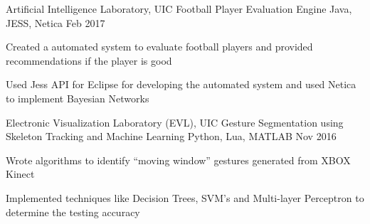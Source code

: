 \begin{cventries}
{\begin{cvitems}
      \end{cvitems}
    }
    \cventry
    {Artificial Intelligence Laboratory, UIC}
    {Football Player Evaluation Engine\vspace{-2mm}}
    {Java, JESS, Netica\vspace{-2mm}}
    {Feb 2017}
    {
      \begin{cvitems}
        \item {Created a automated system to evaluate football players and provided recommendations if the player is good}
        \item{Used Jess API for Eclipse for developing the automated system and used Netica to implement Bayesian Networks\vspace{-2mm}}
      \end{cvitems}
    }
  \cventry
    {Electronic Visualization Laboratory (EVL), UIC}
    {Gesture Segmentation using Skeleton Tracking and Machine Learning\vspace{-2mm}}
    {Python, Lua, MATLAB\vspace{-2mm}}
    {Nov 2016}
    {
      \begin{cvitems}
        \item {Wrote algorithms to identify “moving window” gestures generated from XBOX Kinect}
        \item{Implemented techniques like Decision Trees, SVM's and Multi-layer Perceptron to determine the testing accuracy\vspace{-4mm}}
      \end{cvitems}
    }
\end{cventries}
\vspace{-15mm}